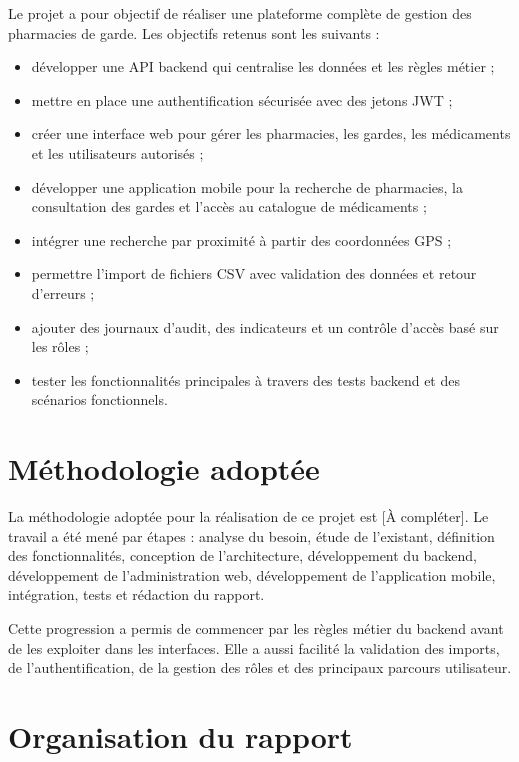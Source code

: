 Le projet a pour objectif de réaliser une plateforme complète de gestion des pharmacies de garde. Les
objectifs retenus sont les suivants :

\begin{itemize}
    \item développer une API backend qui centralise les données et les règles métier ;
    \item mettre en place une authentification sécurisée avec des jetons JWT ;
    \item créer une interface web pour gérer les pharmacies, les gardes, les médicaments et les utilisateurs autorisés ;
    \item développer une application mobile pour la recherche de pharmacies, la consultation des gardes et l'accès au catalogue de médicaments ;
    \item intégrer une recherche par proximité à partir des coordonnées GPS ;
    \item permettre l'import de fichiers CSV avec validation des données et retour d'erreurs ;
    \item ajouter des journaux d'audit, des indicateurs et un contrôle d'accès basé sur les rôles ;
    \item tester les fonctionnalités principales à travers des tests backend et des scénarios fonctionnels.
\end{itemize}

\section*{Méthodologie adoptée}

La méthodologie adoptée pour la réalisation de ce projet est [À compléter]. Le travail a été mené par
étapes : analyse du besoin, étude de l'existant, définition des fonctionnalités, conception de
l'architecture, développement du backend, développement de l'administration web, développement de
l'application mobile, intégration, tests et rédaction du rapport.

Cette progression a permis de commencer par les règles métier du backend avant de les exploiter dans les
interfaces. Elle a aussi facilité la validation des imports, de l'authentification, de la gestion des rôles
et des principaux parcours utilisateur.

\section*{Organisation du rapport}

